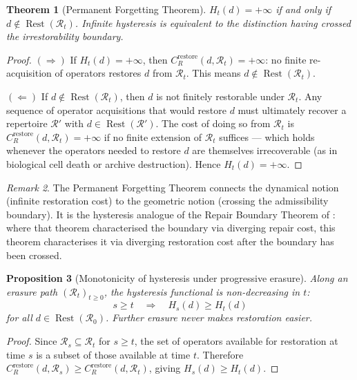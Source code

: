 \documentclass[12pt, oneside]{article}
\theoremstyle{plain}
\newtheorem{theorem}{Theorem}[section]
\newtheorem{proposition}[theorem]{Proposition}
\theoremstyle{definition}
\theoremstyle{remark}
\newtheorem{remark}[theorem]{Remark}
\DeclareMathOperator{\Rest}{Rest}
\newcommand{\CR}{C_{\!R}}
\newcommand{\Rt}{\mathcal{R}_t}
\newcommand{\Rzero}{\mathcal{R}_0}
\newcommand{\Hyster}{H}
\begin{document}
\begin{theorem}[Permanent Forgetting Theorem]
  $\Hyster_t(d) = +\infty$ if and only if
  $d \notin \Rest(\Rt)$.
  Infinite hysteresis is equivalent to the distinction having
  crossed the irrestorability boundary.
  \label{thm:permanent}
\end{theorem}

\begin{proof}
  $(\Rightarrow)$\;
  If $\Hyster_t(d) = +\infty$, then
  $\CR^{\mathrm{restore}}(d, \Rt) = +\infty$: no finite
  re-acquisition of operators restores $d$ from $\Rt$.
  This means $d \notin \Rest(\Rt)$.

  $(\Leftarrow)$\;
  If $d \notin \Rest(\Rt)$, then $d$ is not finitely restorable
  under $\Rt$.
  Any sequence of operator acquisitions that would restore $d$
  must ultimately recover a repertoire $\mathcal{R}'$ with
  $d \in \Rest(\mathcal{R}')$.
  The cost of doing so from $\Rt$ is $\CR^{\mathrm{restore}}(d,
  \Rt) = +\infty$ if no finite extension of $\Rt$ suffices ---
  which holds whenever the operators needed to restore $d$ are
  themselves irrecoverable (as in biological cell death or archive
  destruction).
  Hence $\Hyster_t(d) = +\infty$.
\end{proof}

\begin{remark}
  The Permanent Forgetting Theorem connects the dynamical notion
  (infinite restoration cost) to the geometric notion (crossing the
  admissibility boundary).
  It is the hysteresis analogue of the Repair Boundary Theorem of
  \cite{Flyxion2026a}: where that theorem characterised the boundary
  via diverging repair cost, this theorem characterises it via
  diverging restoration cost after the boundary has been crossed.
\end{remark}

\begin{proposition}[Monotonicity of hysteresis under progressive erasure]
  Along an erasure path $(\Rt)_{t \geq 0}$, the hysteresis
  functional is non-decreasing in $t$:
  \[
    s \geq t \quad\Longrightarrow\quad
    \Hyster_s(d) \geq \Hyster_t(d)
  \]
  for all $d \in \Rest(\Rzero)$.
  Further erasure never makes restoration easier.
\end{proposition}

\begin{proof}
  Since $\mathcal{R}_s \subseteq \Rt$ for $s \geq t$, the set of
  operators available for restoration at time $s$ is a subset of
  those available at time $t$.
  Therefore $\CR^{\mathrm{restore}}(d, \mathcal{R}_s) \geq
  \CR^{\mathrm{restore}}(d, \Rt)$, giving
  $\Hyster_s(d) \geq \Hyster_t(d)$.
\end{proof}
\end{document}
